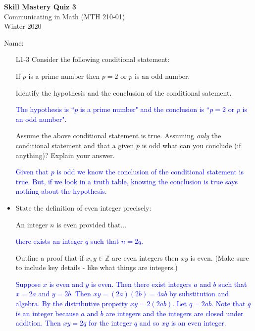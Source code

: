 \documentclass[10pt]{article}
\newcommand{\Z}{\mathbb{Z}}
\newcommand{\bs}{\begin{solution}}
\begin{document}
\vspace{-1.2in}
\begin{center} \textbf{\Large{Skill Mastery Quiz 3}} \\
Communicating in Math (MTH 210-01)\\
Winter 2020
\end{center}



\noindent Name: 




\begin{itemize}
	\item[L1-3] 
	Consider the following conditional statement:
	\begin{center}
	If $p$ is a prime number then $p=2$ or $p$ is an odd number.
	\end{center}
	Identify the hypothesis and the conclusion of the conditional satement. 
		\bs\textcolor{blue}{The hypothesis is ``$p$ is a prime number" and the conclusion is ``$p=2$ or $p$ is an odd number".}\end{solution}

	\vspace{.5in}
	
	Assume the above conditional statement is true. Assuming \emph{only} the conditional statement and that a given $p$ is odd what can you conclude (if anything)?  Explain your answer.


	\bs\textcolor{blue}{Given that $p$ is odd we know the conclusion of the conditional statement is true. But, if we look in a truth table, knowing the conclusion is true says nothing about the hypothesis.}\end{solution}

\vfill



\item[L2-3] State the definition of even integer precisely:

An integer $n$ is even provided that...

\bs\textcolor{blue}{ there exists an integer $q$ such that $n=2q$.}\end{solution}

\vfill
Outline a proof that if $x,y\in \Z$ are even integers then $xy$ is even. (Make sure to include key details - like what things are integers.)
 
 \bs\textcolor{blue}{Suppose $x$ is even and $y$ is even. Then there exist integers $a$ and $b$ such that $x=2a$ and $y=2b$. Then $xy=(2a)(2b) = 4ab$ by substitution and algebra. By the distributive property $xy=2(2ab)$. Let $q=2ab$. Note that $q$ is an integer because $a$ and $b$ are integers and the integers are closed under addition. Then $xy=2q$ for the integer $q$ and so $xy$ is an even integer.}\end{solution}
\vfill
\vfill
\vfill
\vfill


\end{itemize}
\end{document}
